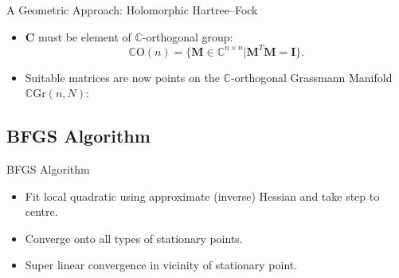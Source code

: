 \documentclass{beamer}
\begin{document}
\begin{frame}{A Geometric Approach: Holomorphic Hartree--Fock}
\begin{itemize}
  \item<1-> $\mathbf{C}$ must be element of $\mathbb{C}$-orthogonal group:
  $$\mathbb{C}\mathrm{O} \left( n \right) = \{ \mathbf{M} \in \mathbb{C}^{n \times n} | \mathbf{M}^{T} \mathbf{M} = \mathbf{I} \}.$$
\end{itemize}
\vspace{-1em}
\begin{itemize}
\item<3-> Suitable matrices are now points on the \alert{$\mathbb{C}$-orthogonal} Grassmann Manifold $\mathbb{C}\mathrm{Gr}(n,N):$
\end{itemize}
\end{frame}

\subsection{BFGS Algorithm}
\begin{frame}{BFGS Algorithm}
\begin{itemize}
\item Fit local quadratic using \alert{approximate} (inverse) Hessian and take step to centre.
\item Converge onto \alert{all types} of stationary points.
\item Super linear convergence in vicinity of stationary point.
\end{itemize}
\end{frame}
\end{document}
